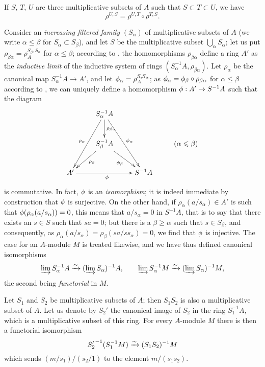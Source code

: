 \begin{env}[1.4.4]
\label{0.1.4.4}
If $S$, $T$, $U$ are three multiplicative subsets of $A$ such that
$S\subset T\subset U$, we have
\[
  \rho^{U,S}=\rho^{U,T}\circ\rho^{T,S}.
\]
\end{env}

\begin{env}[1.4.5]
\label{0.1.4.5}
Consider an {\em increasing filtered family} $(S_\alpha)$ of multiplicative
subsets of $A$ (we write $\alpha\leqslant\beta$ for $S_\alpha\subset S_\beta$),
and let $S$ be the multiplicative subset $\bigcup_\alpha S_\alpha$; let us put
$\rho_{\beta\alpha}=\rho_A^{S_\beta,S_\alpha}$ for $\alpha\leqslant\beta$;
according to , the homomorphisms $\rho_{\beta\alpha}$ define a
ring $A'$ as the {\em inductive limit} of the inductive system of rings
$(S_\alpha^{-1}A,\rho_{\beta\alpha})$. Let $\rho_\alpha$ be the canonical map
$S_\alpha^{-1}A\to A'$, and let $\phi_\alpha=\rho_A^{S,S_\alpha}$; as
$\phi_\alpha=\phi_\beta\circ\rho_{\beta\alpha}$ for $\alpha\leqslant\beta$
according to , we can uniquely define a homomorphism
$\phi:A'\to S^{-1}A$ such that the diagram
\[
  \xymatrix{
    & S_\alpha^{-1}A\ar[ddl]_{\rho_\alpha}
                    \ar[d]^{\rho_{\beta\alpha}}
                    \ar[rdd]^{\vphi_\alpha}\\
    & S_\beta^{-1}A\ar[ld]^{\rho_\beta}
                   \ar[rd]_{\vphi_\beta}
    & & (\alpha\leqslant\beta)\\
    A'\ar[rr]_\vphi
    & & S^{-1}A
  }
\]
is commutative. In fact, $\phi$ is an {\em isomorphism}; it is indeed
immediate by construction that $\phi$ is surjective. On the other hand, if
$\rho_\alpha(a/s_\alpha)\in A'$ is such that $\phi(\rho_\alpha(a/s_\alpha))=0$,
this means that $a/s_\alpha=0$ in $S^{-1}A$, that is to say that there exists an
$s\in S$ such that $sa=0$; but there is a $\beta\geqslant\alpha$ such that
$s\in S_\beta$, and consequently, as
$\rho_\alpha(a/s_\alpha)=\rho_\beta(sa/ss_\alpha)=0$, we find that $\phi$ is
injective. The case for an $A$-module $M$ is treated likewise, and we have thus
defined canonical isomorphisms
\[
  \varinjlim S_\alpha^{-1}A\xrightarrow{\sim}(\varinjlim S_\alpha)^{-1}A,\qquad
  \varinjlim S_\alpha^{-1}M\xrightarrow{\sim}(\varinjlim S_\alpha)^{-1}M,
\]
the second being {\em functorial} in $M$.
\end{env}

\begin{env}[1.4.6]
\label{0.1.4.6}
Let $S_1$ and $S_2$ be multiplicative subsets of $A$; then $S_1 S_2$ is also a
multiplicative subset of $A$. Let us denote by $S_2'$ the canonical image of
$S_2$ in the ring $S_1^{-1}A$, which is a multiplicative subset of this ring.
For every $A$-module $M$ there is then a functorial isomorphism
\[
  {S_2'}^{-1}(S_1^{-1}M)\xrightarrow{\sim}(S_1 S_2)^{-1}M
\]
which sends $(m/s_1)/(s_2/1)$ to the element $m/(s_1 s_2)$.
\end{env}

